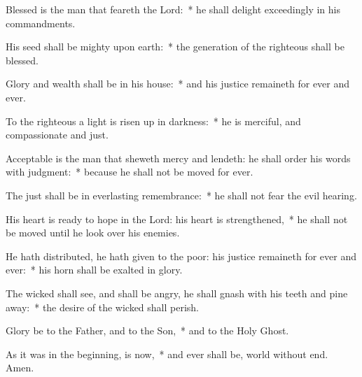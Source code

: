 \begin{enpars}
\item Blessed is the man that feareth the Lord:~* he shall delight exceedingly in his commandments.
\item His seed shall be mighty upon earth:~* the generation of the righteous shall be blessed.
\item Glory and wealth shall be in his house:~* and his justice remaineth for ever and ever.
\item To the righteous a light is risen up in darkness:~* he is merciful, and compassionate and just.
\item Acceptable is the man that sheweth mercy and lendeth: he shall order his words with judgment:~* because he shall not be moved for ever.
\item The just shall be in everlasting remembrance:~* he shall not fear the evil hearing.
\item His heart is ready to hope in the Lord: his heart is strengthened,~* he shall not be moved until he look over his enemies.
\item He hath distributed, he hath given to the poor: his justice remaineth for ever and ever:~* his horn shall be exalted in glory.
\item The wicked shall see, and shall be angry, he shall gnash with his teeth and pine away:~* the desire of the wicked shall perish.
\item Glory be to the Father, and to the Son,~* and to the Holy Ghost. 
\item As it was in the beginning, is now,~* and ever shall be, world without end. Amen.
\end{enpars}